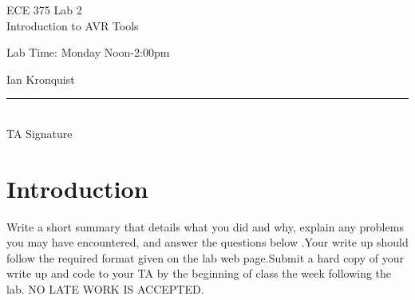 \documentclass[12pt,letterpaper]{article}
\begin{document}
\begin{titlepage}
    \vspace*{4cm}
    \begin{flushright}
    {\huge
        ECE 375 Lab 2\\[1cm]
    }
    {\large
        Introduction to AVR Tools
    }
    \end{flushright}
    \begin{flushleft}
    Lab Time: Monday Noon-2:00pm
    \end{flushleft}
    \begin{flushright}
    Ian Kronquist
    \vfill
    \rule{5in}{.5mm}\\
    TA Signature
    \end{flushright}

\end{titlepage}

\section{Introduction}
Write a short summary that details what you did and why, explain any problems you may have encountered, and answer the questions below .Your write up should follow the required format given on the lab web page.Submit a hard copy of your write up and code to your TA by the beginning of class the week following the lab. NO LATE WORK IS ACCEPTED.
\end{document}
